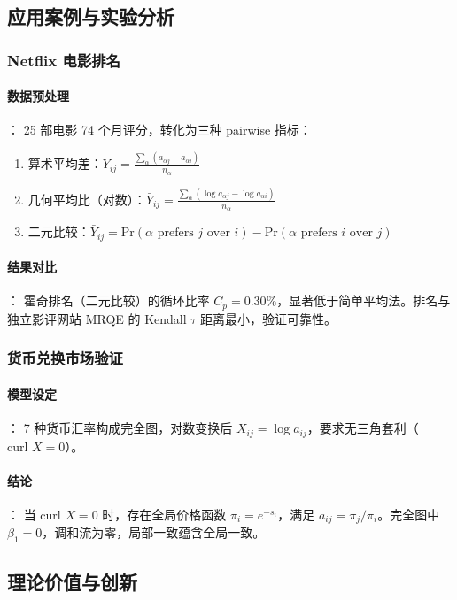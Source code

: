 \documentclass[a4paper]{article}
\begin{document}
\subsection{应用案例与实验分析}

\subsubsection{Netflix 电影排名}
\paragraph{数据预处理}：
25 部电影 74 个月评分，转化为三种 pairwise 指标：
\begin{enumerate}
    \item 算术平均差：$\bar{Y}_{ij} = \frac{\sum_{\alpha} (a_{\alpha j} - a_{\alpha i})}{n_{\alpha}}$
    \item 几何平均比（对数）：$\bar{Y}_{ij} = \frac{\sum_{\alpha} (\log a_{\alpha j} - \log a_{\alpha i})}{n_{\alpha}}$
    \item 二元比较：$\bar{Y}_{ij} = \text{Pr}(\alpha \text{ prefers } j \text{ over } i) - \text{Pr}(\alpha \text{ prefers } i \text{ over } j)$
\end{enumerate}

\paragraph{结果对比}：
霍奇排名（二元比较）的循环比率 $C_p = 0.30\%$，显著低于简单平均法。排名与独立影评网站 MRQE 的 Kendall $\tau$ 距离最小，验证可靠性。

\subsubsection{货币兑换市场验证}
\paragraph{模型设定}：
7 种货币汇率构成完全图，对数变换后 $X_{ij} = \log a_{ij}$，要求无三角套利（$\text{curl } X = 0$）。

\paragraph{结论}：
当 $\text{curl } X = 0$ 时，存在全局价格函数 $\pi_i = e^{-s_i}$，满足 $a_{ij} = \pi_j / \pi_i$。完全图中 $\beta_1 = 0$，调和流为零，局部一致蕴含全局一致。

\subsection{理论价值与创新}
\end{document}
